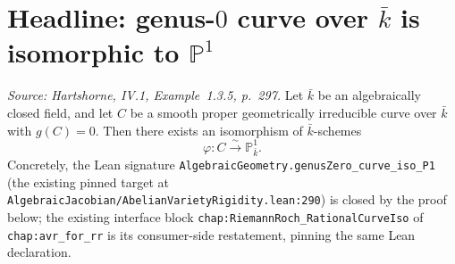 \section{Headline: genus-\(0\) curve over \(\bar k\) is isomorphic to \(\mathbb P^1\)}
\begin{theorem}

  \label{thm:genus_zero_curve_iso_p1}
  \textit{Source: Hartshorne, IV.1, Example~1.3.5, p.~297.}
  Let \(\bar k\) be an algebraically closed field, and let \(C\) be a smooth
  proper geometrically irreducible curve over \(\bar k\) with \(g(C) = 0\).
  Then there exists an isomorphism of \(\bar k\)-schemes
  \[
    \varphi \colon C \stackrel{\sim}{\longrightarrow} \mathbb P^1_{\bar k}.
  \]
  Concretely, the Lean signature
  \texttt{AlgebraicGeometry.genusZero\_curve\_iso\_P1} (the existing pinned
  target at \texttt{AlgebraicJacobian/AbelianVarietyRigidity.lean:290}) is
  closed by the proof below; the existing interface block
  \texttt{chap:RiemannRoch_RationalCurveIso} of
  \texttt{chap:avr_for_rr} is its consumer-side restatement,
  pinning the same Lean declaration.
\end{theorem}
